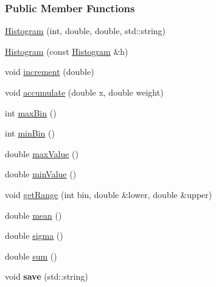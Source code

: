 \subsubsection*{Public Member Functions}
\begin{DoxyCompactItemize}
\item 
\hyperlink{classHistogram_a0e67c772215a44412bea53d7c42a9afd}{Histogram} (int, double, double, std::string)
\item 
\hyperlink{classHistogram_a57bd7d0018ca67ebc964a70856a45121}{Histogram} (const \hyperlink{classHistogram}{Histogram} \&h)
\item 
void \hyperlink{classHistogram_aeb18a84d7511ee5955ce41c2e566ed42}{increment} (double)
\item 
\hypertarget{classHistogram_ac071a756a6a7e7b762e54d40a3b063d2}{
void \hyperlink{classHistogram_ac071a756a6a7e7b762e54d40a3b063d2}{accumulate} (double x, double weight)}
\label{classHistogram_ac071a756a6a7e7b762e54d40a3b063d2}

\item 
\hypertarget{classHistogram_a1adaf843802a7dd123aa3d981a3fe40a}{
int \hyperlink{classHistogram_a1adaf843802a7dd123aa3d981a3fe40a}{maxBin} ()}
\label{classHistogram_a1adaf843802a7dd123aa3d981a3fe40a}

\item 
\hypertarget{classHistogram_ad8f309ad710edf09dd5b5f5212fea317}{
int \hyperlink{classHistogram_ad8f309ad710edf09dd5b5f5212fea317}{minBin} ()}
\label{classHistogram_ad8f309ad710edf09dd5b5f5212fea317}

\item 
\hypertarget{classHistogram_ab03071830f982d65161093f6e21d337b}{
double \hyperlink{classHistogram_ab03071830f982d65161093f6e21d337b}{maxValue} ()}
\label{classHistogram_ab03071830f982d65161093f6e21d337b}

\item 
\hypertarget{classHistogram_aa542bc0d079c028891332f075e36de6d}{
double \hyperlink{classHistogram_aa542bc0d079c028891332f075e36de6d}{minValue} ()}
\label{classHistogram_aa542bc0d079c028891332f075e36de6d}

\item 
\hypertarget{classHistogram_a232fa623a8fb507ce61f3d4d887261c4}{
void \hyperlink{classHistogram_a232fa623a8fb507ce61f3d4d887261c4}{getRange} (int bin, double \&lower, double \&upper)}
\label{classHistogram_a232fa623a8fb507ce61f3d4d887261c4}

\item 
double \hyperlink{classHistogram_a60aec75a406846e8ddfcb5cd3bfd08b6}{mean} ()
\item 
double \hyperlink{classHistogram_ace6b4ef16828ca568a9ffb6195f2f85a}{sigma} ()
\item 
double \hyperlink{classHistogram_a66f96b43325ad5daef6c208706cb8116}{sum} ()
\item 
\hypertarget{classHistogram_a503db836fe4146f1978433ceb44fbfd5}{
void {\bfseries save} (std::string)}
\label{classHistogram_a503db836fe4146f1978433ceb44fbfd5}


\end{DoxyCompactItemize}
